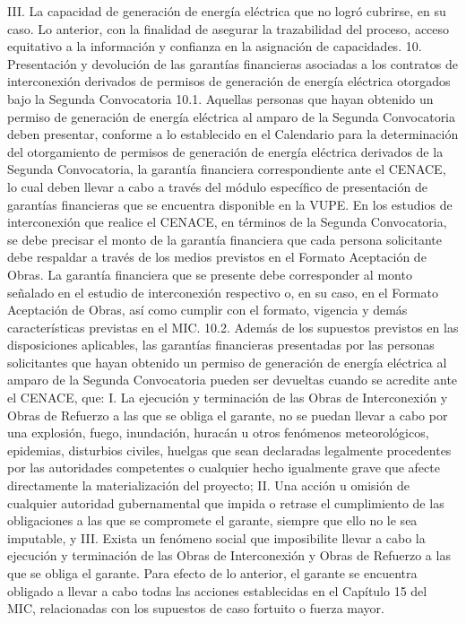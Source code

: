 III. La capacidad de generación de energía eléctrica que no logró cubrirse, en su caso.
Lo anterior, con la finalidad de asegurar la trazabilidad del proceso, acceso equitativo a la información y confianza en la asignación de capacidades.
10. Presentación y devolución de las garantías financieras asociadas a los contratos de interconexión derivados de permisos de generación de energía eléctrica otorgados bajo la Segunda Convocatoria
10.1. Aquellas personas que hayan obtenido un permiso de generación de energía eléctrica al amparo de la Segunda Convocatoria deben presentar, conforme a lo establecido en el Calendario para la determinación del otorgamiento de permisos de generación de energía eléctrica derivados de la Segunda Convocatoria, la garantía financiera correspondiente ante el CENACE, lo cual deben llevar a cabo a través del módulo específico de presentación de garantías financieras que se encuentra disponible en la VUPE.
En los estudios de interconexión que realice el CENACE, en términos de la Segunda Convocatoria, se debe precisar el monto de la garantía financiera que cada persona solicitante debe respaldar a través de los medios previstos en el Formato Aceptación de Obras. La garantía financiera que se presente debe corresponder al monto señalado en el estudio de interconexión respectivo o, en su caso, en el Formato Aceptación de Obras, así como cumplir con el formato, vigencia y demás características previstas en el MIC.
10.2. Además de los supuestos previstos en las disposiciones aplicables, las garantías financieras presentadas por las personas solicitantes que hayan obtenido un permiso de generación de energía eléctrica al amparo de la Segunda Convocatoria pueden ser devueltas cuando se acredite ante el CENACE, que:
I. La ejecución y terminación de las Obras de Interconexión y Obras de Refuerzo a las que se obliga el garante, no se puedan llevar a cabo por una explosión, fuego, inundación, huracán u otros fenómenos meteorológicos, epidemias, disturbios civiles, huelgas que sean declaradas legalmente procedentes por las autoridades competentes o cualquier hecho igualmente grave que afecte directamente la materialización del proyecto;
II. Una acción u omisión de cualquier autoridad gubernamental que impida o retrase el cumplimiento de las obligaciones a las que se compromete el garante, siempre que ello no le sea imputable, y
III. Exista un fenómeno social que imposibilite llevar a cabo la ejecución y terminación de las Obras de Interconexión y Obras de Refuerzo a las que se obliga el garante.
Para efecto de lo anterior, el garante se encuentra obligado a llevar a cabo todas las acciones establecidas en el Capítulo 15 del MIC, relacionadas con los supuestos de caso fortuito o fuerza mayor.\par
